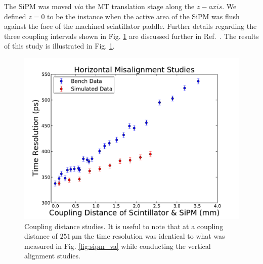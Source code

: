 The SiPM was moved \textit{via} the MT translation stage along the $z-axis$.  We defined $z = 0$ to be the instance when the active area of the SiPM was flush against the face of the machined scintillator paddle.  Further details regarding the three coupling intervals shown in Fig. \ref{fig:sipm_coupling} are discussed further in Ref.~\cite{pooser16}.  The results of this study is illustrated in Fig. \ref{fig:sipm_coupling}.
	\begin{figure}[!htb]
	\centering
	\includegraphics[width=0.83\columnwidth]{misalignment/figs/hori_ma}
	\caption{Coupling distance studies.  It is useful to note that at a coupling distance of $\mathrm{251\ \mu m}$ the time resolution was identical to what was measured in Fig. \ref{fig:sipm_va} while conducting the vertical alignment studies.}
	\label{fig:sipm_coupling}
	\end{figure}

